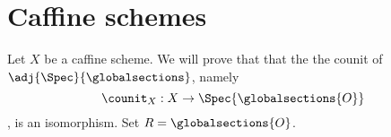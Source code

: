 \section{Caffine schemes}

Let $X$ be a caffine scheme.
We will prove that that the the counit of $\adj{\Spec}{\globalsections}$, namely
\[\counit_X: X \rightarrow \Spec{\globalsections{O}}\], is an isomorphism.
Set $R = \globalsections{O}$.













